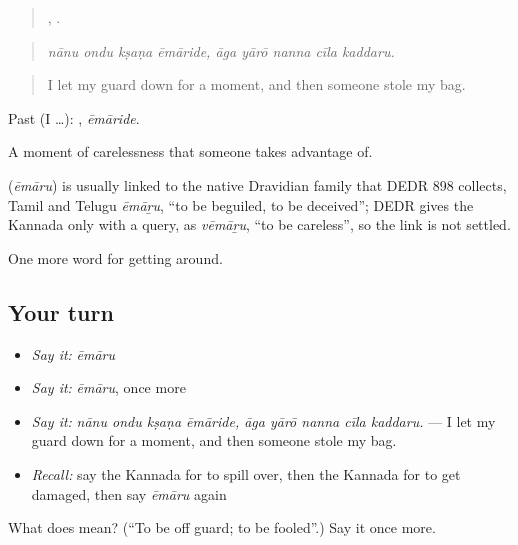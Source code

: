 \begin{quote}
   ,     .
\end{quote}

\begin{quote}
\emph{nānu ondu kṣaṇa ēmāride, āga yārō nanna cīla kaddaru.}
\end{quote}

\begin{quote}
I let my guard down for a moment, and then someone stole my bag.
\end{quote}

Past (I …): , \emph{ēmāride}.

A moment of carelessness that someone takes advantage of.

\begin{cousinweb}
\textbf{} (\emph{ēmāru}) is usually linked to the native Dravidian family that DEDR 898 collects, Tamil and Telugu \emph{ēmāṟu}, \textquotedblleft{}to be beguiled, to be deceived\textquotedblright{}; DEDR gives the Kannada only with a query, as \emph{vēmāṟu}, \textquotedblleft{}to be careless\textquotedblright{}, so the link is not settled.
\end{cousinweb}

\begin{grammarlens}[title={What you've built}]
One more word for getting around.
\end{grammarlens}

\subsection*{Your turn}
\begin{itemize}
\raggedright
  \item \emph{Say it:} \emph{ēmāru}
  \item \emph{Say it:} \emph{ēmāru}, once more
  \item \emph{Say it:} \emph{nānu ondu kṣaṇa ēmāride, āga yārō nanna cīla kaddaru.} — I let my guard down for a moment, and then someone stole my bag.
  \item \emph{Recall:} say the Kannada for to spill over, then the Kannada for to get damaged, then say \emph{ēmāru} again
\end{itemize}

\begin{tcolorbox}[breakable,colback=teal!4,colframe=teal!35!black,title={Before you move on}]
What does  mean? (\textquotedblleft{}To be off guard; to be fooled\textquotedblright{}.) Say it once more.
\end{tcolorbox}
